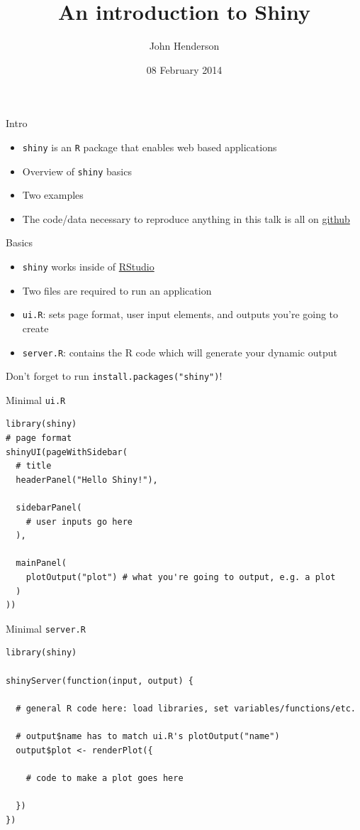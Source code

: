 \documentclass[sans,aspectratio=169,presentation,bigger,fleqn]{beamer}
\author{John Henderson}
\date{08 February 2014}
\title{An introduction to Shiny}
\begin{document}
\maketitle

\begin{frame}[fragile,label=sec-1]{Intro}
 \begin{itemize}
\item \texttt{shiny} is an \texttt{R} package that enables web based applications
\item Overview of \texttt{shiny} basics
\item Two examples
\item The code/data necessary to reproduce anything in this talk is all on \href{https://github.com/jwhendy/devFest-shiny}{github}
\end{itemize}
\end{frame}
\begin{frame}[fragile,label=sec-2]{Basics}
 \begin{itemize}
\item \texttt{shiny} works inside of \href{http://www.rstudio.com/}{RStudio}

\item Two files are required to run an application
\item \texttt{ui.R}: sets page format, user input elements, and outputs you're going to create
\item \texttt{server.R}: contains the R code which will generate your dynamic output
\end{itemize}

\vspace{0.5cm}

Don't forget to run \texttt{install.packages("shiny")}!
\end{frame}
\begin{frame}[fragile,label=sec-3]{Minimal \texttt{ui.R}}
 \scriptsize
\begin{verbatim}
library(shiny)
# page format
shinyUI(pageWithSidebar(
  # title
  headerPanel("Hello Shiny!"),

  sidebarPanel(
    # user inputs go here
  ),

  mainPanel(
    plotOutput("plot") # what you're going to output, e.g. a plot
  )
))
\end{verbatim}
\scriptsize
\end{frame}
\begin{frame}[fragile,label=sec-4]{Minimal \texttt{server.R}}
 \scriptsize
\begin{verbatim}
library(shiny)

shinyServer(function(input, output) {

  # general R code here: load libraries, set variables/functions/etc.

  # output$name has to match ui.R's plotOutput("name")
  output$plot <- renderPlot({

    # code to make a plot goes here

  })
})
\end{verbatim}
\scriptsize
\end{frame}
\end{document}
